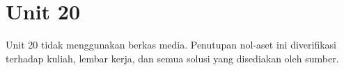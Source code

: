 \section*{Unit 20}
Unit 20 tidak menggunakan berkas media. Penutupan nol-aset ini diverifikasi terhadap kuliah, lembar kerja, dan semua solusi yang disediakan oleh sumber.
